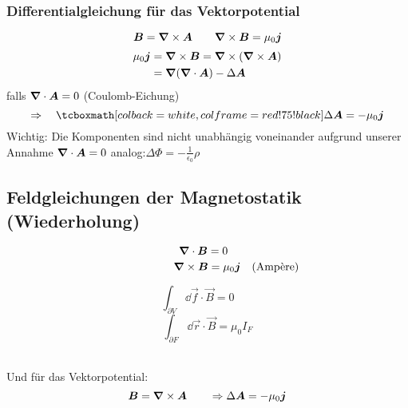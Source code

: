 \subsubsection{Differentialgleichung für das Vektorpotential}

\begin{equation*}
\bm{B} = \bm{\nabla} \times \bm{A} \qquad \bm{\nabla} \times \bm{B} = \mu_0 \bm{j}
\end{equation*}
\begin{align*}
\mu_0 \bm{j} &= \bm{\nabla} \times \bm{B} = \bm{\nabla} \times (\bm{\nabla} \times \bm{A})\\
&= \bm{\nabla}(\bm{\nabla} \cdot \bm{A}) - \Delta \bm{A}
\end{align*}
falls $ \bm{\nabla}\cdot \bm{A} = 0 $ (Coulomb-Eichung)  %
\begin{equation*}
\Rightarrow \quad \rmbox{\Delta \vec{A} = -\mu_0 \vec{j}}
\end{equation*}
Wichtig: Die Komponenten sind nicht unabhängig voneinander aufgrund unserer Annahme $ \bm{\nabla} \cdot \bm{A} = 0 $
analog:$ \Delta \Phi = - \frac{1}{\epsilon_0} \rho $

\subsection{Feldgleichungen der Magnetostatik \texorpdfstring{\tiny(Wiederholung)}{Wiederholung}}

\begin{minipage}{.5\linewidth}
	\begin{equation*}
	\bm{\nabla} \cdot \bm{B} = 0 \ \ 
	\end{equation*}
	\vspace{-5pt}
	\begin{equation*}
	\phantom{\quad (\tx{Amp\`ere})} \vabla \times \vec{B} = \mu_0 \vec{j} \quad (\tx{Amp\`ere})
	\end{equation*}
\end{minipage}%
\begin{minipage}{.5\linewidth}
	\begin{equation*}
	\int_{\partial V} \dd \vec{f} \cdot \vec{B} = 0 \quad \ \ \, \,
	\end{equation*}
	\begin{equation*}
	\int_{\partial F} \dd \vec{r} \cdot \vec{B} = \mu_0 I_F
	\end{equation*}
\end{minipage}%
\\
Und für das Vektorpotential:
\begin{equation*}
\bm{B} = \bm{\nabla} \times \bm{A} \qquad \Rightarrow \Delta  \bm{A} = - \mu_0 \bm{j}
\end{equation*}

